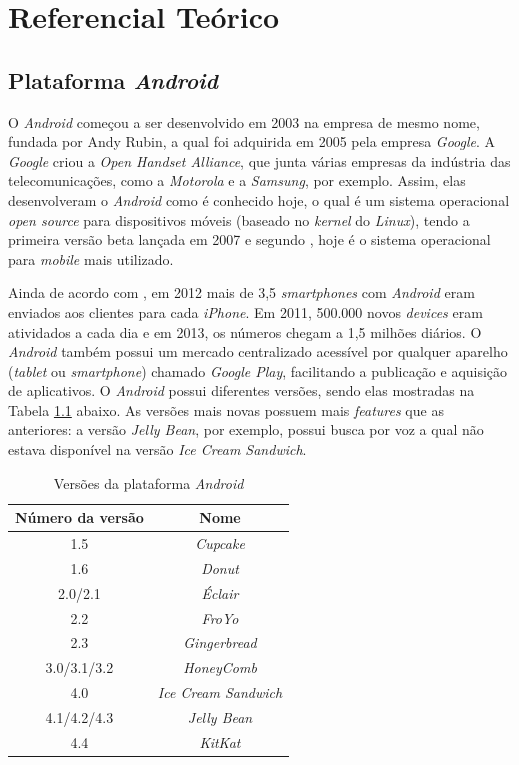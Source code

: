 \chapter[Referencial Teórico]{Referencial Teórico}
\label{refteorico}

\section{Plataforma \textit{Android}}

	O \textit{Android} começou a ser desenvolvido em 2003 na empresa de mesmo nome, fundada por Andy Rubin, a qual foi adquirida em 2005 pela empresa \textit{Google}. A \textit{Google} criou a \textit{Open Handset Alliance}, que junta várias empresas da indústria das telecomunicações, como a \textit{Motorola} e a \textit{Samsung}, por exemplo. Assim, elas desenvolveram o \textit{Android} como é conhecido hoje, o qual é um sistema operacional  \textit{open source} para dispositivos móveis (baseado no \textit{kernel} do \textit{Linux}), tendo a primeira versão beta lançada em 2007 e segundo \cite{android2013}, hoje é o sistema operacional para \textit{mobile} mais utilizado.

	 Ainda de acordo com \cite{android2013}, em 2012 mais de 3,5 \textit{smartphones} com \textit{Android} eram enviados aos clientes para cada \textit{iPhone}. Em 2011, 500.000 novos \textit{devices} eram atividados a cada dia e em 2013, os números chegam a 1,5 milhões diários. O \textit{Android} também possui um mercado centralizado acessível por qualquer aparelho (\textit{tablet} ou \textit{smartphone}) chamado \textit{Google Play}, facilitando a publicação e aquisição de aplicativos. 
	O \textit{Android}  possui diferentes versões, sendo elas mostradas na Tabela \ref{androidTab} abaixo.  As versões mais novas possuem mais \textit{features} que as anteriores: a versão \textit{Jelly Bean}, por exemplo, possui busca por voz a qual não estava disponível na versão \textit{Ice Cream Sandwich}. 

\begin{table}[h]
	\centering	
	\begin{tabular}{cc}
		\toprule
		\textbf{Número da versão} & \textbf{Nome}  \\
		\midrule
		1.5 &  \textit{Cupcake} \\
		1.6 & \textit{Donut} \\
		2.0/2.1 &  \textit{Éclair} \\
		2.2 & \textit{FroYo} \\
		2.3 &  \textit{Gingerbread} \\
		3.0/3.1/3.2 & \textit{HoneyComb} \\
		4.0 & \textit{Ice Cream Sandwich} \\
		4.1/4.2/4.3 & \textit{Jelly Bean} \\
		4.4 &  \textit{KitKat} \\

		\bottomrule
	\end{tabular}
	\caption{ Versões da plataforma \textit{Android}}
	\label{androidTab}
\end{table}

